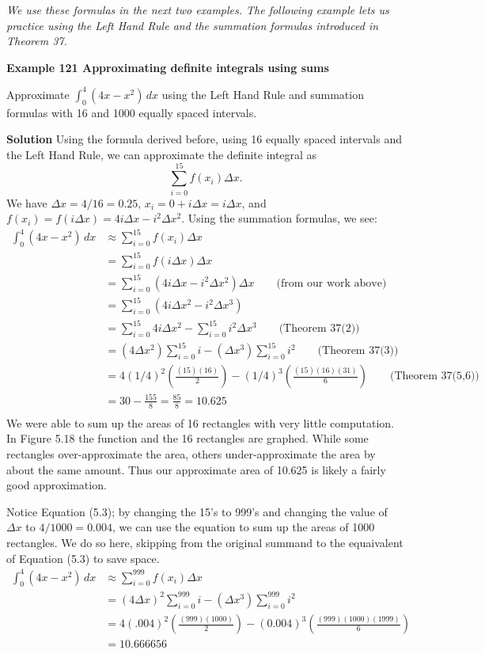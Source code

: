 \documentclass[11pt]{report}
\begin{document}
\begin{enumerate}
\begin{enumerate}
{\slshape We use these formulas in the next two examples. The following example lets us practice using the Left Hand Rule and the summation formulas introduced in Theorem 37.

{\bfseries Example 121 \qquad Approximating definite integrals using sums}

Approximate $\int_0^4 (4x-x^2)\,dx$ using the Left Hand Rule and summation formulas with 16 and 1000 equally spaced intervals.

{\bfseries Solution} Using the formula derived before, using 16 equally spaced intervals and the Left Hand Rule, we can approximate the definite integral as \[\sum_{i=0}^15 f(x_i)\Delta x.\] We have $\Delta x=4/16=0.25$, $x_i=0+i\Delta x=i\Delta x$, and $f(x_i)=f(i\Delta x)=4i\Delta x-i^2\Delta x^2$. Using the summation formulas, we see:
\begin{equation*}
\begin{split}
\int_0^4 (4x-x^2)\,dx &\approx \sum_{i=0}^{15} f(x_i)\Delta x\\
&=\sum_{i=0}^{15} f(i\Delta x)\Delta x\\
&=\sum_{i=0}^{15}(4i\Delta x-i^2\Delta x^2)\Delta x \qquad\text{(from our work above)}\\
&=\sum_{i=0}^{15}(4i\Delta x^2-i^2\Delta x^3)\\
&=\sum_{i=0}^{15}4i\Delta x^2-\sum_{i=0}^{15}i^2\Delta x^3 \qquad\text{(Theorem 37(2))}\\
&=(4\Delta x^2)\sum_{i=0}^{15}i -(\Delta x^3)\sum_{i=0}^{15}i^2\qquad\text{(Theorem 37(3))}\\
&=4(1/4)^2\left(\frac{(15)(16)}{2}\right) -(1/4)^3\left(\frac{(15)(16)(31)}{6}\right)\qquad\text{(Theorem 37(5,6))}\\
&=30-\frac{155}{8}=\frac{85}{8}=10.625\\
\end{split}
\end{equation*}
We were able to sum up the areas of 16 rectangles with very little computation. In Figure 5.18 the function and the 16 rectangles are graphed. While some rectangles over-approximate the area, others under-approximate the area by about the same amount. Thus our approximate area of 10.625 is likely a fairly good approximation.

Notice Equation (5.3); by changing the 15's to 999's and changing the value of $\Delta x$ to $4/1000=0.004$, we can use the equation to sum up the areas of 1000 rectangles. We do so here, skipping from the original summand to the equaivalent of Equation (5.3) to save space.
\begin{equation*}
\begin{split}
\int_0^4 (4x-x^2)\,dx&\approx \sum_{i=0}^{999} f(x_i)\Delta x\\
&=(4\Delta x)^2\sum_{i=0}^{999} i -(\Delta x^3)\sum_{i=0}^{999} i^2\\
&=4(.004)^2\left(\frac{(999)(1000)}{2}\right) -(0.004)^3\left(\frac{(999)(1000)(1999)}{6}\right)\\
&=10.666656\\
\end{split}
\end{equation*}

}
\end{enumerate}
\end{enumerate}
\end{document}
